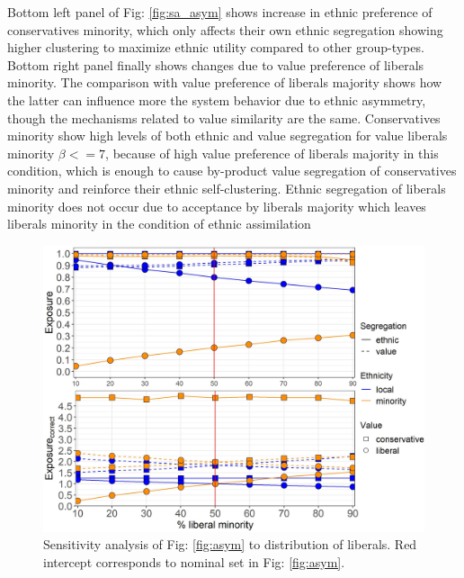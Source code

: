 \documentclass{article}
\begin{document}
Bottom left panel of Fig: \ref{fig:sa_asym} shows increase in ethnic preference of conservatives minority, which only affects their own ethnic segregation showing higher clustering to maximize ethnic utility compared to other group-types. %
Bottom right panel finally shows changes due to value preference of liberals minority. The comparison with value preference of liberals majority shows how the latter can influence more the system behavior due to ethnic asymmetry, though the mechanisms related to value similarity are the same. Conservatives minority show high levels of both ethnic and value segregation for value liberals minority $\beta <= 7$, because of high value preference of liberals majority in this condition, which is enough to cause by-product value segregation of conservatives minority and reinforce their ethnic self-clustering. Ethnic segregation of liberals minority does not occur due to acceptance by liberals majority which leaves liberals minority in the condition of ethnic assimilation %


\begin{figure}[H]
    \centering
    \includegraphics[scale=0.5]{material/figures/comb_dislib.jpg}
    \caption{Sensitivity analysis of Fig: \ref{fig:asym} to distribution of liberals. Red intercept corresponds to nominal set in Fig: \ref{fig:asym}.}
    \label{fig:dislib}
\end{figure} %
\end{document}
